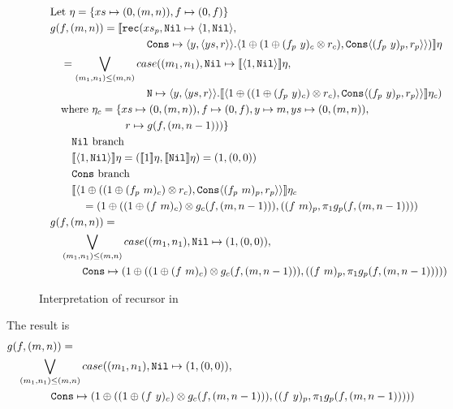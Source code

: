 \begin{figure}
  \label{fig:ws_map_interpretation}
  \caption{Interpretation of recursor in }
  \[\begin{split}
      &\quad \text{Let } \eta = \{ xs \mapsto (0, (m, n)), f \mapsto (0, f)\}\\
      &\quad g(f, (m, n)) = \llbracket \texttt{rec}(xs_p, \texttt{Nil} \mapsto \langle 1, \texttt{Nil}\rangle,\\
      &\qquad\quad\quad\quad\qquad\quad\quad\quad \texttt{Cons} \mapsto \langle y, \langle ys, r \rangle \rangle . \langle 1 \oplus (1 \oplus (f_p\ y)_c \otimes r_c), \texttt{Cons}\langle (f_p\ y)_p, r_p\rangle\rangle) \rrbracket \eta\\
      &\qquad = \bigvee\limits_{(m_1, n_1) \leq (m, n)} case((m_1, n_1), \texttt{Nil} \mapsto \llbracket \langle 1, \texttt{Nil} \rangle \rrbracket \eta, \\
      &\qquad\quad\quad\quad\qquad\quad\quad\quad \texttt{N} \mapsto \langle y, \langle ys, r \rangle \rangle . \llbracket \langle 1 \oplus ((1 \oplus (f_p\ y)_c) \otimes r_c), \texttt{Cons} \langle (f_p\ y)_p, r_p \rangle \rangle \rrbracket \eta_c) \\
      &\qquad \text{where } \eta_c = \{xs \mapsto (0, (m, n)), f \mapsto (0, f), y \mapsto m, ys \mapsto (0, (m, n)), \\
      &\qquad\quad\quad\quad\quad\quad\quad r \mapsto g(f, (m, n-1)))\} \\
      &\qquad\quad \text{\texttt{Nil} branch} \\
      &\qquad\quad \llbracket \langle 1, \texttt{Nil} \rangle \rrbracket \eta = (\llbracket 1 \rrbracket \eta , \llbracket \texttt{Nil} \rrbracket \eta) = (1, (0, 0)) \\
      &\qquad\quad \text{\texttt{Cons} branch} \\
      &\qquad\quad  \llbracket \langle 1 \oplus ((1 \oplus (f_p\ m)_c) \otimes r_c), \texttt{Cons} \langle (f_p\ m)_p, r_p \rangle \rangle \rrbracket \eta_c \\
      &\qquad\quad\quad = (1 \oplus ((1 \oplus (f\ m)_c) \otimes g_c(f, (m, n-1))), ((f\ m)_p, \pi_1 g_p(f, (m, n-1)))) \\
      &\quad g(f, (m, n)) = \\
      &\qquad \bigvee\limits_{(m_1, n_1) \leq (m, n)} case((m_1, n_1), \texttt{Nil} \mapsto (1, (0, 0)), \\
      &\qquad\quad\quad \texttt{Cons} \mapsto (1 \oplus ((1 \oplus (f\ m)_c) \otimes g_c(f, (m, n-1))), ((f\ m)_p, \pi_1 g_p(f, (m, n-1)))))
  \end{split}\]
\end{figure}
%
The result is
%
\begin{equation*}
  \begin{split}
  &g(f, (m, n)) = \\
  &\quad \bigvee\limits_{(m_1, n_1) \leq (m, n)} case((m_1, n_1), \texttt{Nil} \mapsto (1, (0, 0)), \\
  &\qquad\quad\quad \texttt{Cons} \mapsto (1 \oplus ((1 \oplus (f\ y)_c) \otimes g_c(f, (m, n-1))), ((f\ y)_p, \pi_1 g_p(f, (m, n-1)))))
  \end{split}
\end{equation*}


